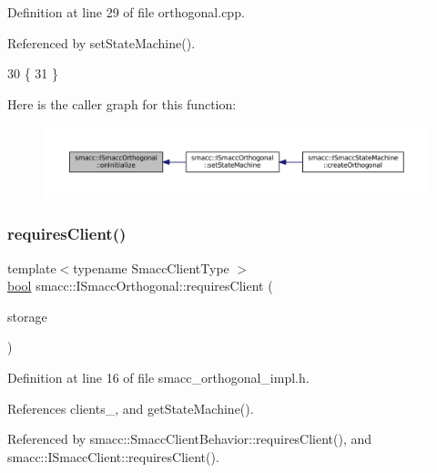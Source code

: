 Definition at line 29 of file orthogonal.\+cpp.



Referenced by set\+State\+Machine().


\begin{DoxyCode}
30   \{
31   \}
\end{DoxyCode}
Here is the caller graph for this function\+:
\nopagebreak
\begin{figure}[H]
\begin{center}
\leavevmode
\includegraphics[width=350pt]{classsmacc_1_1ISmaccOrthogonal_a6bb31c620cb64dd7b8417f8705c79c7a_icgraph}
\end{center}
\end{figure}
\mbox{\label{classsmacc_1_1ISmaccOrthogonal_a602e16b09f8a1b3de889f2f3d90a3211}} 
\subsubsection{\texorpdfstring{requires\+Client()}{requiresClient()}}
{\footnotesize\ttfamily template$<$typename Smacc\+Client\+Type $>$ \\
\hyperlink{classbool}{bool} smacc\+::\+I\+Smacc\+Orthogonal\+::requires\+Client (\begin{DoxyParamCaption}\item[{Smacc\+Client\+Type $\ast$\&}]{storage }\end{DoxyParamCaption})}



Definition at line 16 of file smacc\+\_\+orthogonal\+\_\+impl.\+h.



References clients\+\_\+, and get\+State\+Machine().



Referenced by smacc\+::\+Smacc\+Client\+Behavior\+::requires\+Client(), and smacc\+::\+I\+Smacc\+Client\+::requires\+Client().


